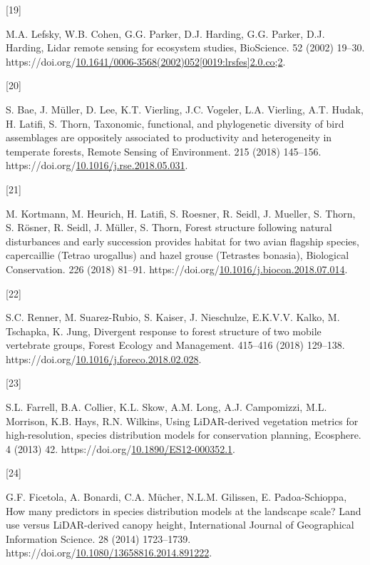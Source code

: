 \documentclass[manuscript, 3p, authoryear]{elsarticle} %
\newlength{\cslhangindent}
\newlength{\csllabelwidth}
\newlength{\cslentryspacingunit} %
\newenvironment{CSLReferences}[2] %
 {%
  \setlength{\parindent}{0pt}
  \ifodd #1
  \let\oldpar\par
  \def\par{\hangindent=\cslhangindent\oldpar}
  \fi
  \setlength{\parskip}{#2\cslentryspacingunit}
 }%
 {}
\newcommand{\CSLLeftMargin}[1]{\parbox[t]{\csllabelwidth}{#1}}
\newcommand{\CSLRightInline}[1]{\parbox[t]{\linewidth - \csllabelwidth}{#1}\break}
\begin{document}
\begin{CSLReferences}{0}{0}
\leavevmode{}%
\CSLLeftMargin{{[}19{]} }%
\CSLRightInline{M.A. Lefsky, W.B. Cohen, G.G. Parker, D.J. Harding, G.G. Parker, D.J. Harding, Lidar remote sensing for ecosystem studies, BioScience. 52 (2002) 19--30. https://doi.org/\href{https://doi.org/10.1641/0006-3568(2002)052\%5B0019:lrsfes\%5D2.0.co;2}{10.1641/0006-3568(2002)052{[}0019:lrsfes{]}2.0.co;2}.}

\leavevmode{}%
\CSLLeftMargin{{[}20{]} }%
\CSLRightInline{S. Bae, J. Müller, D. Lee, K.T. Vierling, J.C. Vogeler, L.A. Vierling, A.T. Hudak, H. Latifi, S. Thorn, Taxonomic, functional, and phylogenetic diversity of bird assemblages are oppositely associated to productivity and heterogeneity in temperate forests, Remote Sensing of Environment. 215 (2018) 145--156. https://doi.org/\href{https://doi.org/10.1016/j.rse.2018.05.031}{10.1016/j.rse.2018.05.031}.}

\leavevmode{}%
\CSLLeftMargin{{[}21{]} }%
\CSLRightInline{M. Kortmann, M. Heurich, H. Latifi, S. Roesner, R. Seidl, J. Mueller, S. Thorn, S. Rösner, R. Seidl, J. Müller, S. Thorn, Forest structure following natural disturbances and early succession provides habitat for two avian flagship species, capercaillie ({Tetrao} urogallus) and hazel grouse ({Tetrastes} bonasia), Biological Conservation. 226 (2018) 81--91. https://doi.org/\href{https://doi.org/10.1016/j.biocon.2018.07.014}{10.1016/j.biocon.2018.07.014}.}

\leavevmode{}%
\CSLLeftMargin{{[}22{]} }%
\CSLRightInline{S.C. Renner, M. Suarez-Rubio, S. Kaiser, J. Nieschulze, E.K.V.V. Kalko, M. Tschapka, K. Jung, Divergent response to forest structure of two mobile vertebrate groups, Forest Ecology and Management. 415--416 (2018) 129--138. https://doi.org/\href{https://doi.org/10.1016/j.foreco.2018.02.028}{10.1016/j.foreco.2018.02.028}.}

\leavevmode{}%
\CSLLeftMargin{{[}23{]} }%
\CSLRightInline{S.L. Farrell, B.A. Collier, K.L. Skow, A.M. Long, A.J. Campomizzi, M.L. Morrison, K.B. Hays, R.N. Wilkins, Using {LiDAR-derived} vegetation metrics for high-resolution, species distribution models for conservation planning, Ecosphere. 4 (2013) 42. https://doi.org/\href{https://doi.org/10.1890/ES12-000352.1}{10.1890/ES12-000352.1}.}

\leavevmode{}%
\CSLLeftMargin{{[}24{]} }%
\CSLRightInline{G.F. Ficetola, A. Bonardi, C.A. Mücher, N.L.M. Gilissen, E. Padoa-Schioppa, How many predictors in species distribution models at the landscape scale? {Land} use versus {LiDAR-derived} canopy height, International Journal of Geographical Information Science. 28 (2014) 1723--1739. https://doi.org/\href{https://doi.org/10.1080/13658816.2014.891222}{10.1080/13658816.2014.891222}.}


\end{CSLReferences}
\end{document}
